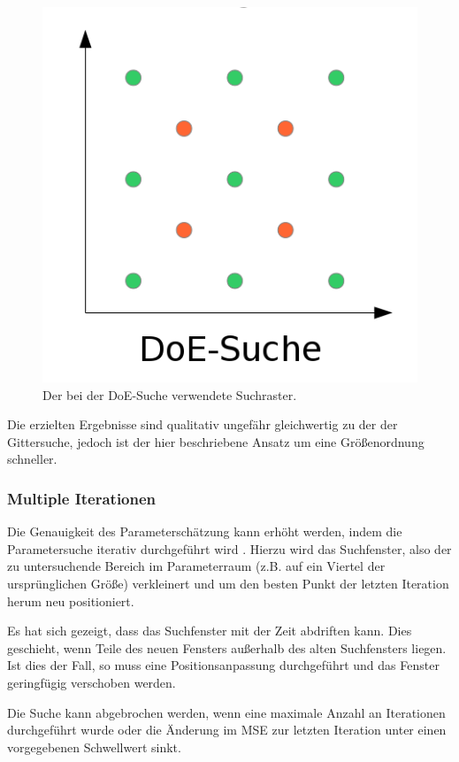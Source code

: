 \begin{figure}[!h]
	\centering
	\includegraphics[scale=1.0]{images/svm/DoE-Suche.png} 
	\caption{Der bei der DoE-Suche verwendete Suchraster.}
	\label{fig:DoE-Suche}
\end{figure}

Die erzielten Ergebnisse sind qualitativ ungefähr gleichwertig zu der der Gittersuche, jedoch ist der hier beschriebene Ansatz um eine Größenordnung schneller.

\subsubsection{Multiple Iterationen}
\label{subsubsec:MultipleIterationen}
Die Genauigkeit des Parameterschätzung kann erhöht werden, indem die Parametersuche iterativ durchgeführt wird \cite{HsuLibsvmTutorial2003}. Hierzu wird das Suchfenster, also der zu untersuchende Bereich im Parameterraum (z.B. auf ein Viertel der ursprünglichen Größe) verkleinert und um den besten Punkt der letzten Iteration herum neu positioniert.

Es hat sich gezeigt, dass das Suchfenster mit der Zeit abdriften kann. Dies geschieht, wenn Teile des neuen Fensters außerhalb des alten Suchfensters liegen. Ist dies der Fall, so muss eine Positionsanpassung durchgeführt und das Fenster geringfügig verschoben werden.

Die Suche kann abgebrochen werden, wenn eine maximale Anzahl an Iterationen durchgeführt wurde oder die Änderung im MSE zur letzten Iteration unter einen vorgegebenen Schwellwert sinkt.

